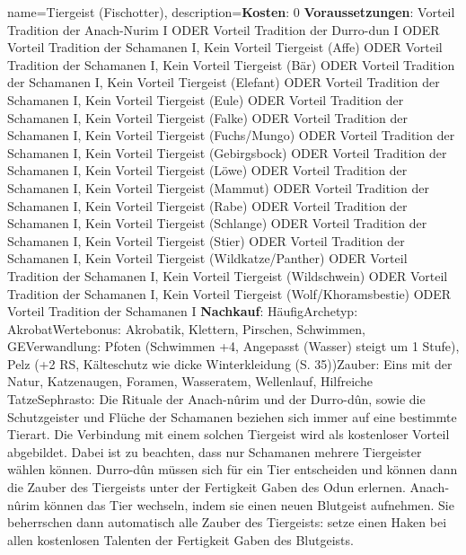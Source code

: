 {
    name={Tiergeist (Fischotter)},
    description={\textbf{Kosten}: 0 \textbf{Voraussetzungen}: Vorteil Tradition der Anach-Nurim I ODER Vorteil Tradition der Durro-dun I ODER Vorteil Tradition der Schamanen I, Kein Vorteil Tiergeist (Affe) ODER Vorteil Tradition der Schamanen I, Kein Vorteil Tiergeist (Bär) ODER Vorteil Tradition der Schamanen I, Kein Vorteil Tiergeist (Elefant) ODER Vorteil Tradition der Schamanen I, Kein Vorteil Tiergeist (Eule) ODER Vorteil Tradition der Schamanen I, Kein Vorteil Tiergeist (Falke) ODER Vorteil Tradition der Schamanen I, Kein Vorteil Tiergeist (Fuchs/Mungo) ODER Vorteil Tradition der Schamanen I, Kein Vorteil Tiergeist (Gebirgsbock) ODER Vorteil Tradition der Schamanen I, Kein Vorteil Tiergeist (Löwe) ODER Vorteil Tradition der Schamanen I, Kein Vorteil Tiergeist (Mammut) ODER Vorteil Tradition der Schamanen I, Kein Vorteil Tiergeist (Rabe) ODER Vorteil Tradition der Schamanen I, Kein Vorteil Tiergeist (Schlange) ODER Vorteil Tradition der Schamanen I, Kein Vorteil Tiergeist (Stier) ODER Vorteil Tradition der Schamanen I, Kein Vorteil Tiergeist (Wildkatze/Panther) ODER Vorteil Tradition der Schamanen I, Kein Vorteil Tiergeist (Wildschwein) ODER Vorteil Tradition der Schamanen I, Kein Vorteil Tiergeist (Wolf/Khoramsbestie) ODER Vorteil Tradition der Schamanen I \textbf{Nachkauf}: Häufig\newline Archetyp: Akrobat\newline Wertebonus: Akrobatik, Klettern, Pirschen, Schwimmen, GE\newline Verwandlung: Pfoten (Schwimmen +4, Angepasst (Wasser) steigt um 1 Stufe), Pelz (+2 RS, Kälteschutz wie dicke Winterkleidung (S. 35))\newline Zauber: Eins mit der Natur, Katzenaugen, Foramen, Wasseratem, Wellenlauf, Hilfreiche Tatze\newline Sephrasto: Die Rituale der Anach-nûrim und der Durro-dûn, sowie die Schutzgeister und Flüche der Schamanen beziehen sich immer auf eine bestimmte Tierart. Die Verbindung mit einem solchen Tiergeist wird als kostenloser Vorteil abgebildet. Dabei ist zu beachten, dass nur Schamanen mehrere Tiergeister wählen können. Durro-dûn müssen sich für ein Tier entscheiden und können dann die Zauber des Tiergeists unter der Fertigkeit Gaben des Odun erlernen. Anach-nûrim können das Tier wechseln, indem sie einen neuen Blutgeist aufnehmen. Sie beherrschen dann automatisch alle Zauber des Tiergeists: setze einen Haken bei allen kostenlosen Talenten der Fertigkeit Gaben des Blutgeists.}
}


